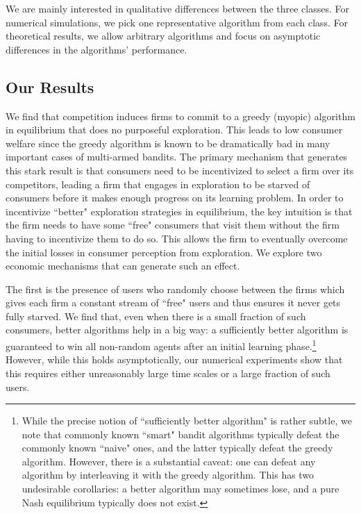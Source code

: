 \noindent We are mainly interested in qualitative differences between the three classes. For numerical simulations, we pick one representative algorithm from each class. For theoretical results, we allow arbitrary algorithms and focus on asymptotic differences in the algorithms' performance.




\subsection{Our Results}
\label{sec:intro-results}

We find that competition induces firms to commit to a greedy (myopic) algorithm in equilibrium that does no purposeful exploration. This leads to low consumer welfare since the greedy algorithm is known to be dramatically bad in many important cases of multi-armed bandits. The primary mechanism that generates this stark result is that consumers need to be incentivized to select a firm over its competitors, leading a firm that engages in exploration to be starved of consumers before it makes enough progress on its learning problem. In order to incentivize ``better" exploration strategies in equilibrium, the key intuition is that the firm needs to have some ``free" consumers that visit them without the firm having to incentivize them to do so. This allows the firm to eventually overcome the initial losses in consumer perception from exploration. We explore two economic mechanisms that can generate such an effect.

The first is the presence of users who randomly choose between the firms which gives each firm a constant stream of ``free" users and thus ensures it never gets fully starved. We find that, even when there is a small fraction of such consumers, better algorithms help in a big way: a sufficiently better algorithm is guaranteed to win all non-random agents after an initial learning phase.\footnote{While the precise notion of ``sufficiently better algorithm" is rather subtle, we note that commonly known ``smart" bandit algorithms typically defeat the commonly known ``naive" ones, and the latter typically defeat the greedy algorithm. However, there is a substantial caveat: one can defeat any algorithm by interleaving it with the greedy algorithm. This has two undesirable corollaries: a better algorithm may sometimes lose, and a pure Nash equilibrium typically does not exist.} However, while this holds asymptotically, our numerical experiments show that this requires either unreasonably large time scales or a large fraction of such users.

